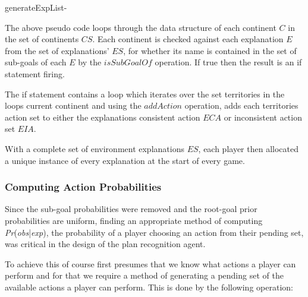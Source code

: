 \documentclass[parskip]{cs4rep}
\begin{document}
\begin{pseudocode}[ruled]{generateExpList}{-}
\begin{algorithm}[H]
\end{algorithm}
\end{pseudocode}

The above pseudo code loops through the data structure of each continent $C$ in the set of continents $CS$. Each continent is checked against each explanation $E$ from the set of explanations' $ES$, for whether its name is contained in the set of sub-goals of each $E$ by the $isSubGoalOf$ operation. If true then the result is an if statement firing. 

The if statement contains a loop which iterates over the set territories in the loops current continent and using the $addAction$ operation, adds each territories action set to either the explanations consistent action $ECA$ or inconsistent action set $EIA$.

With a complete set of environment explanations $ES$, each player then allocated a unique instance of every explanation at the start of every game. 

\subsubsection{Computing Action Probabilities}

Since the sub-goal probabilities were removed and the root-goal prior probabilities are uniform, finding an appropriate method of computing \textit{Pr}(\textit{obs}|\textit{exp}), the probability of a player choosing an action from their pending set, was critical in the design of the plan recognition agent. 

To achieve this of course first presumes that we know what actions a player can perform and for that we require a method of generating a pending set of the available actions a player can perform. This is done by the following operation:
\end{document}
